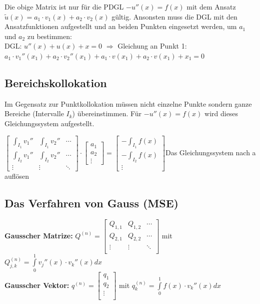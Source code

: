 Die obige Matrix ist nur für die PDGL $-u''(x) = f(x)$ mit dem Ansatz
$\tilde{u}(x) = a_1 \cdot v_1(x) + a_2 \cdot v_2(x)$ gültig. Ansonsten muss die
DGL mit den Ansatzfunktionen aufgestellt und an beiden Punkten eingesetzt
werden, um $a_1$ und $a_2$ zu bestimmen:\\
DGL: $u''(x) + u(x) + x = 0$ $\Rightarrow$ Gleichung an Punkt 1: $a_1 \cdot
v_1''(x_1) + a_2 \cdot v_2''(x_1) + a_1 \cdot v(x_1) + a_2 \cdot v(x_1) + x_1 =
0$




\subsection{Bereichskollokation}
Im Gegensatz zur Punktkollokation müssen nicht einzelne Punkte sondern ganze Bereiche (Intervalle $I_k$) übereinstimmen. Für $-u''(x) = f(x)$ wird dieses Gleichungssystem aufgestellt.

$\begin{bmatrix}
	\int_{I_1} v_1'' & \int_{I_1} v_2''& \cdots\\
	\int_{I_2} v_1'' & \int_{I_2} v_2''& \cdots\\
	\vdots& \vdots&\ddots
\end{bmatrix}\cdot
\begin{bmatrix}
a_1\\
a_2\\
\vdots
\end{bmatrix}
=\begin{bmatrix}
-\int_{I_1} f(x)\\
-\int_{I_2} f(x)\\
\vdots
\end{bmatrix}$\qquad Das Gleichungssystem nach a auflösen


\subsection{Das Verfahren von Gauss (MSE)}

\textbf{Gausscher Matrize: }
$Q^{(n)}=\begin{bmatrix}
	Q_{1,1}& Q_{1,2}&\cdots\\
	Q_{2,1}& Q_{2,2}&\cdots\\
	\vdots & \vdots &\ddots\\
\end{bmatrix}$ \qquad mit \qquad $Q_{j,k}^{(n)}=\int\limits_{0}^{1}{v_j''(x)\cdot v_k''(x) dx}$\\
\textbf{Gausscher Vektor: } 
$q^{(n)}=\begin{bmatrix}
	q_1\\
	q_2\\
	\vdots\\
\end{bmatrix}$ \qquad mit \qquad $q_{k}^{(n)}=\int\limits_{0}^{1}{f(x)\cdot v_k''(x) dx}$\\

